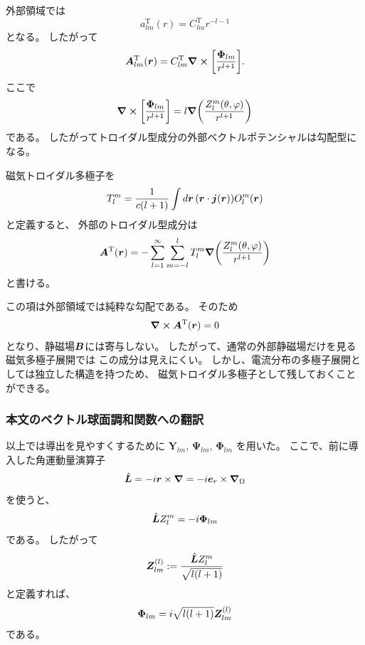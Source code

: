 \documentclass[../master.tex]{subfiles}
\begin{document}
外部領域では
\begin{equation}
    a_{lm}^{\mathrm{T}}(r)
    =
    C_{lm}^{\mathrm{T}}r^{-l-1}
\end{equation}
となる。
したがって
\begin{equation}
    \vb*{A}^{\mathrm{T}}_{lm}(\vb*{r})
    =
    C_{lm}^{\mathrm{T}}
    \curl\qty[
    \frac{\boldsymbol{\Phi}_{lm}}{r^{l+1}}
    ].
\end{equation}
ここで
\begin{equation}
    \curl\qty[
    \frac{\boldsymbol{\Phi}_{lm}}{r^{l+1}}
    ]
    =
    l\grad\qty(
    \frac{Z_l^m(\theta,\varphi)}{r^{l+1}}
    )
\end{equation}
である。
したがってトロイダル型成分の外部ベクトルポテンシャルは勾配型になる。

磁気トロイダル多極子を
\begin{equation}
    {
    T_l^m
    =
    \frac{1}{c(l+1)}
    \int d\vb*{r}\,
    \qty(\vb*{r}\cdot\vb*{j}(\vb*{r}))
    O_l^m(\vb*{r})
    }
\end{equation}
と定義すると、
外部のトロイダル型成分は
\begin{equation}
    {
    \vb*{A}^{\mathrm{T}}(\vb*{r})
    =
    -\sum_{l=1}^{\infty}\sum_{m=-l}^{l}
    T_l^m
    \grad\qty(
    \frac{Z_l^m(\theta,\varphi)}{r^{l+1}}
    )
    }
\end{equation}
と書ける。

この項は外部領域では純粋な勾配である。
そのため
\begin{equation}
    \curl\vb*{A}^{\mathrm{T}}(\vb*{r})=0
\end{equation}
となり、静磁場\(\vb*{B}\)には寄与しない。
したがって、通常の外部静磁場だけを見る磁気多極子展開では
この成分は見えにくい。
しかし、電流分布の多極子展開としては独立した構造を持つため、
磁気トロイダル多極子として残しておくことができる。

\subsubsection*{本文のベクトル球面調和関数への翻訳}

以上では導出を見やすくするために
\(\boldsymbol{Y}_{lm}\),
\(\boldsymbol{\Psi}_{lm}\),
\(\boldsymbol{\Phi}_{lm}\)
を用いた。
ここで、前に導入した角運動量演算子
\begin{equation}
    \hat{\vb*{L}}
    =
    -i\vb*{r}\times\grad
    =
    -i\vb*{e}_r\times\grad_\Omega
\end{equation}
を使うと、
\begin{equation}
    \hat{\vb*{L}}Z_l^m
    =
    -i\boldsymbol{\Phi}_{lm}
\end{equation}
である。
したがって
\begin{equation}
    \vb*{Z}_{lm}^{(l)}
    :=
    \frac{\hat{\vb*{L}}Z_l^m}{\sqrt{l(l+1)}}
\end{equation}
と定義すれば、
\begin{equation}
    \boldsymbol{\Phi}_{lm}
    =
    i\sqrt{l(l+1)}
    \vb*{Z}_{lm}^{(l)}
\end{equation}
である。
\end{document}
